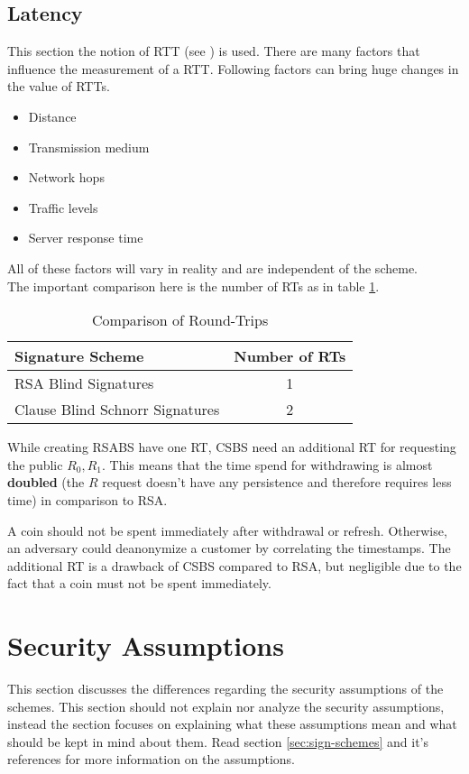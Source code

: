 \subsection{Latency}
This section the notion of \acl{RTT} (see \cite{geeks:rtt}) is used.
There are many factors that influence the measurement of a \acl{RTT}.
Following factors can bring huge changes in the value of \ac{RTT}s.
\begin{itemize}
    \item Distance
    \item Transmission medium
    \item Network hops
    \item Traffic levels
    \item Server response time
\end{itemize}
All of these factors will vary in reality and are independent of the scheme.\\
The important comparison here is the number of \ac{RT}s as in table \ref{tab:comp-rtt}.
\begin{table}[ht]
    \centering
    \setupBfhTabular
    \begin{tabular}{lc}
        \rowcolor{BFH-tablehead}
        \textbf{Signature Scheme} & \textbf{Number of RTs} \\\hline
        RSA Blind Signatures & 1\\\hline
        Clause Blind Schnorr Signatures & 2\\\hline
    \end{tabular}
    \caption{Comparison of Round-Trips}
    \label{tab:comp-rtt}
\end{table}

While creating \gls{RSABS} have one \ac{RT}, \gls{CSBS} need an additional \ac{RT} for requesting the public $R_0, R_1$.
This means that the time spend for withdrawing is almost \textbf{doubled} (the $ R $ request doesn't have any persistence and therefore requires less time) in comparison to RSA.

A coin should not be spent immediately after withdrawal or refresh.
Otherwise, an adversary could deanonymize a customer by correlating the timestamps.
The additional \ac{RT} is a drawback of \gls{CSBS} compared to RSA, but negligible due to the fact that a coin must not be spent immediately.

\section{Security Assumptions}
\label{sec:disc-sec-assumptions}
This section discusses the differences regarding the security assumptions of the schemes.
This section should not explain nor analyze the security assumptions, instead the section focuses on explaining what these assumptions mean and what should be kept in mind about them.
Read section \ref{sec:sign-schemes} and it's references for more information on the assumptions.

